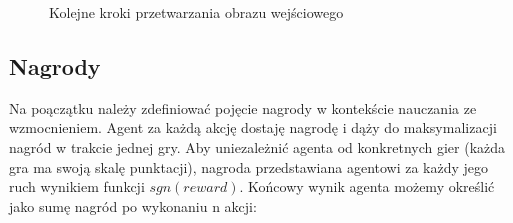 \documentclass[12pt]{article}
\begin{document}
\begin{figure}[H]%
\centering
{}%
\qquad
{}%
\qquad
{}%
\qquad
{}%
\caption{Kolejne kroki przetwarzania obrazu wejściowego}
\end{figure}


\subsection{Nagrody}

Na poączątku należy zdefiniować pojęcie nagrody w kontekście nauczania ze wzmocnieniem. Agent za każdą akcję dostaję nagrodę i dąży do maksymalizacji nagród w trakcie jednej gry. Aby uniezależnić agenta od konkretnych gier (każda gra ma swoją skalę punktacji), nagroda przedstawiana agentowi za każdy jego ruch wynikiem funkcji $sgn(reward)$. Końcowy wynik agenta możemy określić jako sumę nagród po wykonaniu n akcji:
\end{document}
